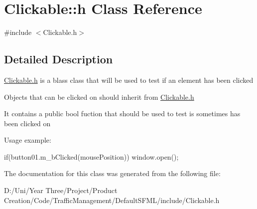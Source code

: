 \hypertarget{class_clickable_1_1h}{}\section{Clickable\+:\+:h Class Reference}
\label{class_clickable_1_1h}


{\ttfamily \#include $<$Clickable.\+h$>$}



\subsection{Detailed Description}
\hyperlink{class_clickable_1_1h}{Clickable.\+h} is a blass class that will be used to test if an element has been clicked

Objects that can be clicked on should inherit from \hyperlink{class_clickable_1_1h}{Clickable.\+h}

It contains a public bool fuction that should be used to test is sometimes has been clicked on

Usage example\+: 
\begin{DoxyCode}
\textcolor{keywordflow}{if}(button01.m\_bClicked(mousePosition)) window.open();
\end{DoxyCode}
 

The documentation for this class was generated from the following file\+:\begin{DoxyCompactItemize}
\item 
D\+:/\+Uni/\+Year Three/\+Project/\+Product Creation/\+Code/\+Traffic\+Management/\+Default\+S\+F\+M\+L/include/Clickable.\+h\end{DoxyCompactItemize}
